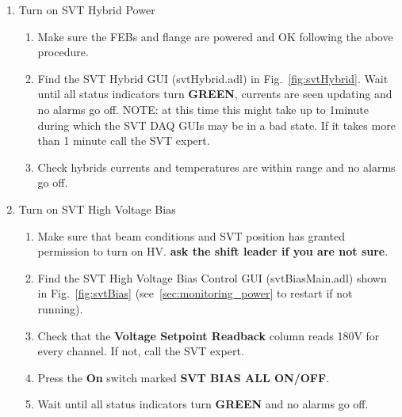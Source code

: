 \documentclass[12pt]{report}
\begin{document}
\begin{enumerate}
\item Turn on SVT Hybrid Power
\begin{enumerate}
\item
Make sure the FEBs and flange are powered and OK following the above procedure.
\item 
Find the SVT Hybrid GUI (svtHybrid.adl) in Fig.~\ref{fig:svtHybrid}.
Wait until all status indicators turn \textbf{GREEN}, currents are seen updating and no alarms go off.\newline
NOTE: at this time this might take up to 1minute during which the SVT DAQ GUIs may be in a bad state. If it takes more than 1 minute call the SVT expert.
\item
Check hybrids currents and temperatures are within range and no alarms go off.
\end{enumerate}





\item Turn on SVT High Voltage Bias
\begin{enumerate}
\item
Make sure that beam conditions and SVT position has granted permission to turn on HV. \textbf{ask the shift leader if you are not sure}.
\item
Find the SVT High Voltage Bias Control GUI (svtBiasMain.adl) shown in Fig.~\ref{fig:svtBias} (see~\ref{sec:monitoring_power} to restart if not running).
\item
Check that the \textbf{Voltage Setpoint Readback} column reads 180V for every channel. If not, call the SVT expert.
\item
Press the \textbf{On} switch marked \textbf{SVT BIAS ALL ON/OFF}.
\item
Wait until all status indicators turn {\color{green} \textbf{GREEN}} and no alarms go off.
\end{enumerate}


\end{enumerate}
\end{document}
